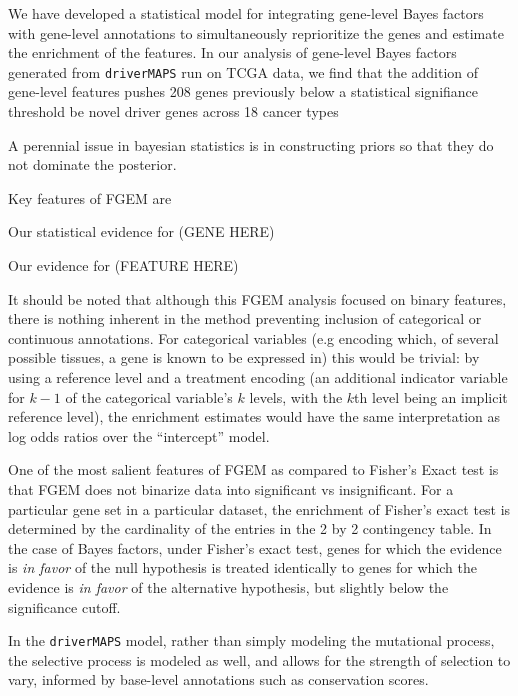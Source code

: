 We have developed a statistical model for integrating gene-level Bayes factors with gene-level annotations to simultaneously reprioritize the genes and estimate the enrichment of the features. In our analysis of gene-level Bayes factors generated from \texttt{driverMAPS} run on TCGA data, we find that the addition of gene-level features pushes 208 genes previously below a statistical signifiance threshold be novel driver genes across 18 cancer types


A perennial issue in bayesian statistics is in constructing priors so that they do not dominate the posterior.

Key features of FGEM are

Our statistical evidence for (GENE HERE)

Our evidence for (FEATURE HERE)

It should be noted that although this FGEM analysis focused on binary features, there is nothing inherent in the method preventing inclusion of categorical or continuous annotations.  For categorical variables (e.g encoding which, of several possible tissues, a gene is known to be expressed in) this would be
trivial: by using a reference level \cite{chambers1992statistical} and a treatment encoding (an additional indicator variable for $k-1$ of the categorical variable's $k$ levels, with the $k$th level being an implicit reference level), the enrichment estimates would have the same interpretation as log odds ratios over the ``intercept'' model.

One of the most salient features of FGEM as compared to Fisher's Exact test is that FGEM does not binarize data into significant vs insignificant.  For a particular gene set in a particular dataset, the enrichment of Fisher's exact test is determined by the cardinality of the entries in the 2 by 2 contingency table.  In the case of Bayes factors, under Fisher's exact test, genes for which the evidence is \emph{in favor} of the null hypothesis is treated identically to genes for which the evidence is \emph{in favor} of the alternative hypothesis, but slightly below the significance cutoff. 


In the \texttt{driverMAPS} model, rather than simply modeling the mutational process, the selective process is modeled as well, and allows for the strength of selection to vary, informed by base-level annotations such as conservation scores.  

